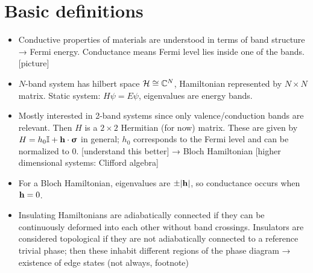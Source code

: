 


\section{Basic definitions}
{\color{blue}
\begin{itemize}
	\item Conductive properties of materials are understood in terms of band structure → Fermi energy. Conductance means Fermi level lies inside one of the bands. [picture]
	
	\item $N$-band system has hilbert space $\mathcal{H}\cong\mathbb{C}^N$, Hamiltonian represented by $N\times N$ matrix. Static system: $H\psi = E\psi$, eigenvalues are energy bands.
	
	\item Mostly interested in 2-band systems since only valence/conduction bands are relevant. Then $H$ is a $2\times 2$ Hermitian (for now) matrix. These are given by $H = h_0\mathbb{I} + \vb{h}\cdot\bm{\upsigma}$ in general; $h_0$ corresponds to the Fermi level and can be normalized to 0. [understand this better] → Bloch Hamiltonian [higher dimensional systems: Clifford algebra]
	
	\item For a Bloch Hamiltonian, eigenvalues are $\pm\abs{\vb{h}}$, so conductance occurs when $\vb{h} = 0$.
	
	\item Insulating Hamiltonians are adiabatically connected if they can be continuously deformed into each other without band crossings. Insulators are considered topological if they are not adiabatically connected to a reference trivial phase; then these inhabit different regions of the phase diagram → existence of edge states (not always\cite{Bernevig_topological-insulators}, footnote)
\end{itemize}
}

